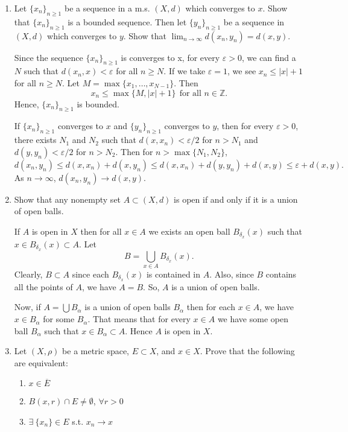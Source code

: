 \documentclass[12pt]{article}
\begin{document}
\begin{enumerate}
\item Let $\{x_n\}_{n \geq 1}$ be a sequence in a m.s.
    $(X, d)$ which converges to $x$. Show that
    $\{x_n\}_{n \geq 1}$ is a bounded sequence.
    Then let $\{y_n\}_{n \geq 1}$ be a sequence in
    $(X, d)$ which converges to $y$. Show that
    $\lim_{n \to \infty} d(x_n, y_n) = d(x,y)$. 
\begin{mybox}

    Since the sequence $\{x_n\}_{n \geq 1}$ is converges
    to x,
    for every $\varepsilon>0$, we can find a $N$ such that
    $d(x_n,x)<\varepsilon$ for all $n\geq N$. If we take
    $\varepsilon=1$, we see $x_n\leq|x|+1$ for all
    $n\geq N$. Let $M=\max\{x_1,\ldots,x_{N-1}\}$. Then
    $$x_n\leq \max\{M,|x|+1\}\ \ \text{for all }n\in
    \mathbb{Z}.$$
    Hence, $\{x_n\}_{n \geq 1}$ is bounded.

    \vspace*{3mm}
    If $\{x_n\}_{n \geq 1}$ converges to $x$ and
    $\{y_n\}_{n \geq 1}$ converges to $y$, then for every
    $\varepsilon>0$, there exists $N_1$ and $N_2$ such
    that $d(x,x_n)<\varepsilon/2$ for $n>N_1$ and
    $d(y,y_n)<\varepsilon/2$ for $n>N_2$. Then
    for $n>\max\{N_1, N_2\}$,
    $$d(x_n,y_n)\leq d(x,x_n)+d(x,y_n)\leq
    d(x,x_n)+d(y,y_n)+d(x,y)\leq\varepsilon+d(x,y).$$
    As $n\to\infty$, $d(x_n,y_n)\to d(x,y)$.
\end{mybox}
 
\item Show that any nonempty set $A\subset (X, d)$
    is open if and only if it is a
    union of open balls.
\begin{mybox}

    If $A$ is open in $X$ then for all $x\in A$ we exists
    an open ball $B_{\delta_x}(x)$ such that
    $x\in B_{\delta_x}(x)\subset A$.
    Let $$B=\bigcup_{x\in A}{B_{\delta_x}(x)}.$$
    Clearly, $B\subset A$ since each $B_{\delta_x}(x)$
    is contained in $A$. Also, since $B$ contains all the
    points of $A$, we have $A=B$. So, $A$ is a union
    of open balls.
    
    \vspace*{3mm}
    Now, if $A=\bigcup{B_\alpha}$ is a union of open
    balls $B_\alpha$ then
    for each $x\in A$, we have $x \in B_\alpha$ for some
    $B_\alpha$. That means that for every $x\in A$ we have
    some open ball $B_\alpha$ such that
    $x\in B_\alpha\subset A$. Hence $A$ is open in $X$.
\end{mybox}


\item Let $(X, \rho)$ be a metric space, $E \subset X$, and $x \in X$. Prove that the following are equivalent:
\begin{enumerate}
\item $x \in \overline{E}$
\item $B(x,r) \cap E \neq \emptyset$, $\forall r > 0$
\item $\exists \ \{x_n\} \in E$ s.t. $x_n \to x$
\end{enumerate}  
\begin{mybox}


\end{mybox}
\end{enumerate}
\end{document}
